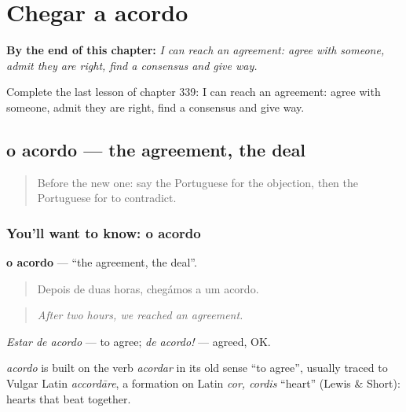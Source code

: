 
\chapter{Chegar a acordo}
\label{ch:pt-chegar-a-acordo}

\begin{chapteropening}
\textbf{By the end of this chapter:} \emph{I can reach an agreement: agree with someone, admit they are right, find a consensus and give way.}

Complete the last lesson of chapter 339: I can reach an agreement: agree with someone, admit they are right, find a consensus and give way.
\end{chapteropening}

\section[o acordo]{o acordo — the agreement, the deal}

\label{lesson:PT-C339-acordo}



\begin{quote}
Before the new one: say the Portuguese for the objection, then the Portuguese for to contradict.
\end{quote}

\subsection*{You'll want to know: o acordo}
\textbf{o acordo} — \textquotedblleft{}the agreement, the deal\textquotedblright{}.

\begin{quote}
Depois de duas horas, chegámos a um acordo.
\end{quote}

\begin{quote}
\emph{After two hours, we reached an agreement.}
\end{quote}

\emph{Estar de acordo} — to agree; \emph{de acordo!} — agreed, OK.

\begin{cousinweb}
\emph{acordo} is built on the verb \emph{acordar} in its old sense \textquotedblleft{}to agree\textquotedblright{}, usually traced to Vulgar Latin \emph{accordāre}, a formation on Latin \emph{cor, cordis} \textquotedblleft{}heart\textquotedblright{} (Lewis \& Short): hearts that beat together.
\end{cousinweb}

